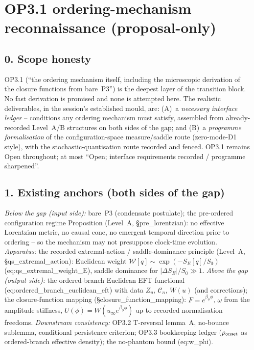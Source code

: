 \section*{OP3.1 ordering-mechanism reconnaissance (proposal-only)}

\subsection*{0. Scope honesty}
OP3.1 (``the ordering mechanism itself, including the microscopic
derivation of the closure functions from bare~P3'') is the deepest
layer of the transition block.
No fast derivation is promised and none is attempted here.
The realistic deliverables, in the session's established mould,
are: (A)~a \emph{necessary interface ledger} -- conditions any
ordering mechanism must satisfy, assembled from already-recorded
Level~A/B structures on both sides of the gap; and (B)~a
\emph{programme formalisation} of the configuration-space
measure/saddle route (zero-mode-D1 style), with the
stochastic-quantisation route recorded and fenced.
OP3.1 remains Open throughout; at most ``Open; interface
requirements recorded / programme sharpened''.

\subsection*{1. Existing anchors (both sides of the gap)}
\emph{Below the gap (input side):} bare~P3 (condensate postulate);
the pre-ordered configuration regime Proposition (Level~A,
\S pre\_lorentzian): no effective Lorentzian metric, no causal
cone, no emergent temporal direction prior to ordering -- so the
mechanism may not presuppose clock-time evolution.
\emph{Apparatus:} the recorded extremal-action / saddle-dominance
principle (Level~A, \S qs\_extremal\_action): Euclidean weight
$\mathcal W[q]\sim\exp(-S_E[q]/S_0)$
(eq:qs\_extremal\_weight\_E), saddle dominance for
$|\Delta S_E|/S_0\gg1$.
\emph{Above the gap (output side):} the ordered-branch Euclidean
EFT functional (eq:ordered\_branch\_euclidean\_eft) with data
$Z_u$, $\mathcal C_n$, $W(u)$ (and corrections); the
closure-function mapping (\S closure\_function\_mapping):
$F=e^{\beta_\phi\phi}$, $\omega$ from the amplitude stiffness,
$U(\phi)=W(u_\infty e^{\beta_\phi\phi})$ up to recorded
normalisation freedoms.
\emph{Downstream consistency:} OP3.2 T-reversal lemma~A,
no-bounce sublemma, conditional persistence criterion; OP3.3
bookkeeping ledger ($\rho_{\rm onset}$ as ordered-branch effective
density); the no-phantom bound (eq:w\_phi).

